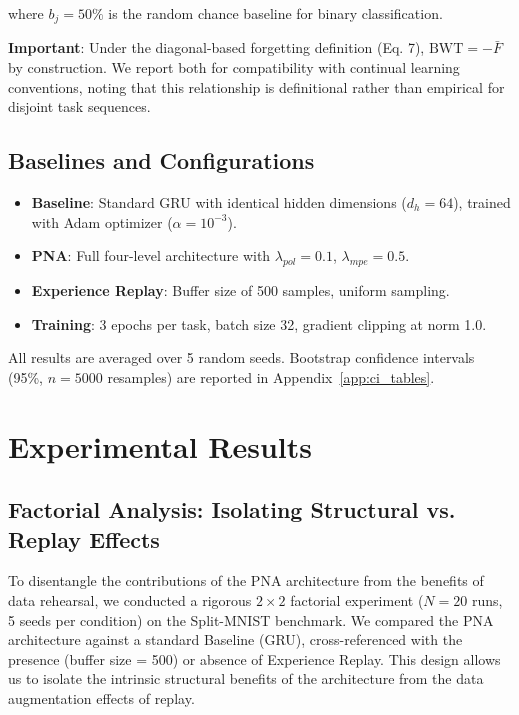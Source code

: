 \documentclass[11pt]{article}
\begin{document}
where $b_j = 50\%$ is the random chance baseline for binary classification.

\textbf{Important}: Under the diagonal-based forgetting definition (Eq. 7), $\text{BWT} = -\bar{F}$ by construction. We report both for compatibility with continual learning conventions, noting that this relationship is definitional rather than empirical for disjoint task sequences.

\subsection{Baselines and Configurations}

\begin{itemize}
    \item \textbf{Baseline}: Standard GRU with identical hidden dimensions ($d_h = 64$), trained with Adam optimizer ($\alpha = 10^{-3}$).

    \item \textbf{PNA}: Full four-level architecture with $\lambda_{pol} = 0.1$, $\lambda_{mpe} = 0.5$.

    \item \textbf{Experience Replay}: Buffer size of 500 samples, uniform sampling.

    \item \textbf{Training}: 3 epochs per task, batch size 32, gradient clipping at norm 1.0.
\end{itemize}

All results are averaged over 5 random seeds. Bootstrap confidence intervals (95\%, $n=5000$ resamples) are reported in Appendix~\ref{app:ci_tables}.

\section{Experimental Results}

\subsection{Factorial Analysis: Isolating Structural vs. Replay Effects}
\label{sec:factorial_analysis}

To disentangle the contributions of the PNA architecture from the benefits of data rehearsal, we conducted a rigorous $2 \times 2$ factorial experiment ($N=20$ runs, 5 seeds per condition) on the Split-MNIST benchmark. We compared the PNA architecture against a standard Baseline (GRU), cross-referenced with the presence (buffer size = 500) or absence of Experience Replay. This design allows us to isolate the intrinsic structural benefits of the architecture from the data augmentation effects of replay.
\end{document}
